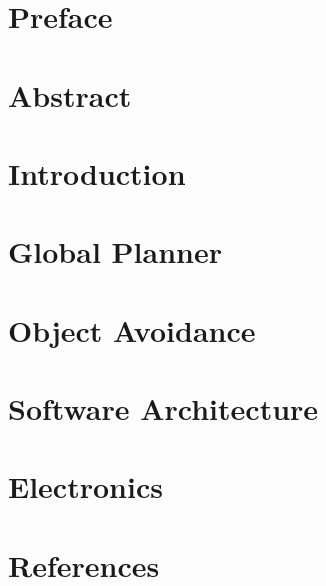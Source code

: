 \documentclass[a4paper,10pt,titlepage]{report}
\begin{document}

\newpage


\newpage
{}

\newcommand{\todo}[1]{\textbf{\textsc{\textcolor{red}{[#1]}}}}

\chapter{Preface}

\label{preface}
\newpage

\chapter{Abstract}

\label{abstract}
\newpage

\tableofcontents

\chapter{Introduction}

\label{introduction}
\newpage

\newpage
\chapter{Global Planner}

\label{global_planner}

\newpage
\chapter{Object Avoidance}

\label{object_avoidance}

\newpage
\chapter{Software Architecture}
\label{Software Architecture}


\newpage
\chapter{Electronics}

\label{electronics}

\newpage
\chapter{References}
\label{references}





\end{document}

